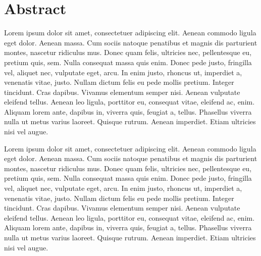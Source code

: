 \documentclass[11pt,a4paper]{scrreprt}
\begin{document}
\section*{Abstract}
\thispagestyle{empty}

Lorem ipsum dolor sit amet, consectetuer adipiscing elit. Aenean commodo ligula eget dolor. Aenean massa. Cum sociis natoque penatibus et magnis dis parturient montes, nascetur ridiculus mus. Donec quam felis, ultricies nec, pellentesque eu, pretium quis, sem. Nulla consequat massa quis enim. Donec pede justo, fringilla vel, aliquet nec, vulputate eget, arcu. In enim justo, rhoncus ut, imperdiet a, venenatis vitae, justo. Nullam dictum felis eu pede mollis pretium. Integer tincidunt. Cras dapibus. Vivamus elementum semper nisi. Aenean vulputate eleifend tellus. Aenean leo ligula, porttitor eu, consequat vitae, eleifend ac, enim. Aliquam lorem ante, dapibus in, viverra quis, feugiat a, tellus. Phasellus viverra nulla ut metus varius laoreet. Quisque rutrum. Aenean imperdiet. Etiam ultricies nisi vel augue.

\bigskip
\noindent
Lorem ipsum dolor sit amet, consectetuer adipiscing elit. Aenean commodo ligula eget dolor. Aenean massa. Cum sociis natoque penatibus et magnis dis parturient montes, nascetur ridiculus mus. Donec quam felis, ultricies nec, pellentesque eu, pretium quis, sem. Nulla consequat massa quis enim. Donec pede justo, fringilla vel, aliquet nec, vulputate eget, arcu. In enim justo, rhoncus ut, imperdiet a, venenatis vitae, justo. Nullam dictum felis eu pede mollis pretium. Integer tincidunt. Cras dapibus. Vivamus elementum semper nisi. Aenean vulputate eleifend tellus. Aenean leo ligula, porttitor eu, consequat vitae, eleifend ac, enim. Aliquam lorem ante, dapibus in, viverra quis, feugiat a, tellus. Phasellus viverra nulla ut metus varius laoreet. Quisque rutrum. Aenean imperdiet. Etiam ultricies nisi vel augue.


\tableofcontents
{}
\clearpage

\cleardoublepage
{}
{}
\listoffigures
\end{document}
